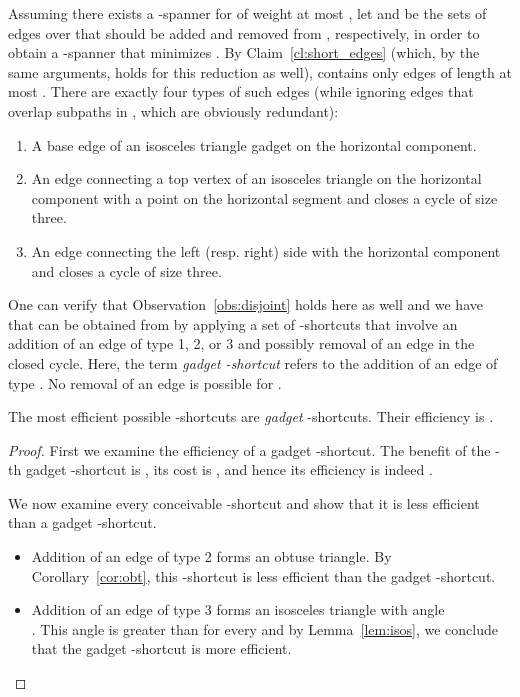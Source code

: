 \documentclass[a4paper]{llncs}
\begin{document}
Assuming there exists a -spanner for  of weight at most ,
let  and  be the sets of edges over  that should be added and removed 
from , respectively, in order to obtain a -spanner  
that minimizes .
By Claim~\ref{cl:short_edges} (which, by the same arguments, holds for this reduction as well), 
 contains only edges of length at most .
There are exactly four types of such edges 
(while ignoring edges that overlap subpaths in , 
which are obviously redundant):

\begin{enumerate}
\item A base edge of an isosceles triangle gadget on the horizontal component.
\item An edge connecting a top vertex of an isosceles triangle on the horizontal component 
			with a point on the horizontal segment and closes a cycle of size three.
\item An edge connecting the left (resp. right) side with the horizontal component 
			and closes a cycle of size three.
\end{enumerate} 

One can verify that Observation~\ref{obs:disjoint} holds here as well and
we have that  can be obtained from  by applying 
a set of -shortcuts that involve an addition of an edge of type 1, 2, or 3
and possibly removal of an edge in the closed cycle.
Here, the term \emph{gadget -shortcut} refers to
the addition of an edge of type . 
No removal of an edge is possible for .



\begin{myclaim}\label{cl:tri2}
The most efficient possible -shortcuts are \emph{gadget} -shortcuts. 
Their efficiency is .
\end{myclaim}

\begin{proof}
First we examine the efficiency of a gadget -shortcut.
The benefit of the -th gadget -shortcut is ,
its cost is , and hence its efficiency is indeed .

We now examine every conceivable -shortcut and show that it is 
less efficient than a gadget -shortcut.

\begin{itemize}

\item Addition of an edge of type 2 forms an obtuse triangle. 
By Corollary~\ref{cor:obt}, this -shortcut is less efficient than the gadget -shortcut.

\item Addition of an edge of type 3 forms an isosceles triangle with angle \\
. This angle is greater than 
for every  and by Lemma~\ref{lem:isos}, we conclude that the gadget -shortcut is more efficient.

\end{itemize}
\end{proof}
\end{document}
